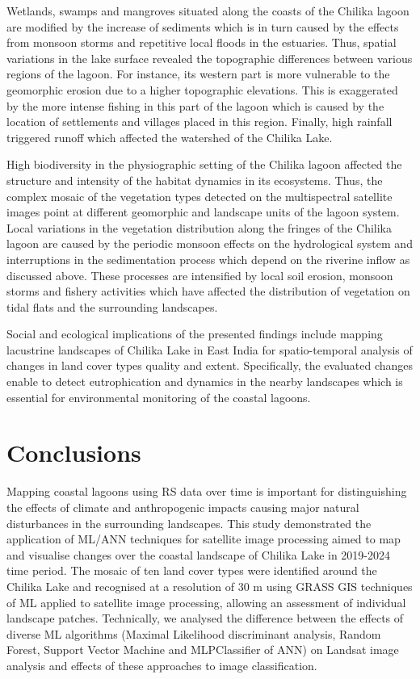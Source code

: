 \documentclass[jmse,article,submit,pdftex,moreauthors]{Definitions/mdpi}
\begin{document}
Wetlands, swamps and mangroves situated along the coasts of the Chilika lagoon are modified by the increase of sediments which is in turn caused by the effects from monsoon storms and repetitive local floods in the estuaries. Thus, spatial variations in the lake surface revealed the topographic differences between various regions of the lagoon. For instance, its western part is more vulnerable to the geomorphic erosion due to a higher topographic elevations. This is exaggerated by the more intense fishing in this part of the lagoon which is caused by the location of settlements and villages placed in this region. Finally, high rainfall triggered runoff which affected the watershed of the Chilika Lake. 

High biodiversity in the physiographic setting of the Chilika lagoon affected the structure and intensity of the habitat dynamics in its ecosystems. Thus, the complex mosaic of the vegetation types detected on the multispectral satellite images point at different geomorphic and landscape units of the lagoon system. Local variations in the vegetation distribution along the fringes of the Chilika lagoon are caused by the periodic monsoon effects on the hydrological system and interruptions in the sedimentation process which depend on the riverine inflow as discussed above. These processes are intensified by local soil erosion, monsoon storms and fishery activities which have affected the distribution of vegetation on tidal flats and the surrounding landscapes. 

Social and ecological implications of the presented findings include mapping lacustrine landscapes of Chilika Lake in East India for spatio-temporal analysis of changes in land cover types quality and extent. Specifically, the evaluated changes enable to detect eutrophication and dynamics in the nearby landscapes which is essential for environmental monitoring of the coastal lagoons.

\section{Conclusions}

Mapping coastal lagoons using RS data over time is important for distinguishing the effects of climate and anthropogenic impacts causing major natural disturbances in the surrounding landscapes. This study demonstrated the application of ML/ANN techniques for satellite image processing aimed to map and visualise changes over the coastal landscape of Chilika Lake in 2019-2024 time period. The mosaic of ten land cover types were identified around the Chilika Lake and recognised at a resolution of 30 m using GRASS GIS techniques of ML applied to satellite image processing, allowing an assessment of individual landscape patches. Technically, we analysed the difference between the effects of diverse ML algorithms (Maximal Likelihood discriminant analysis, Random Forest, Support Vector Machine and MLPClassifier of ANN) on Landsat image analysis and effects of these approaches to image classification. 
\end{document}

